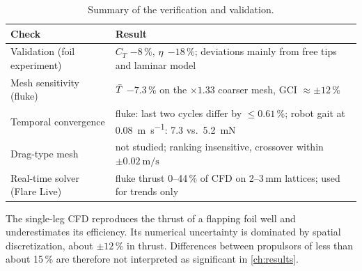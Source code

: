 \begin{table}[H]
  \centering
  \caption[Uncertainty summary]{Summary of the verification and validation.}
  \label{tab:uncertainty}
  \small
  \begin{tabularx}{\textwidth}{@{}l>{\raggedright\arraybackslash}X@{}}
    \toprule
    Check & Result \\
    \midrule
    Validation (foil experiment) & $C_T$ $-8$\,\%, $\eta$ $-18$\,\%; deviations mainly from free tips and laminar model \\
    Mesh sensitivity (fluke) & $\bar{T}$ $-7.3$\,\% on the $\times1.33$ coarser mesh, GCI $\approx\pm12$\,\% \\
    Temporal convergence & fluke: last two cycles differ by $\le0.61$\,\%; robot gait at \SI{0.08}{\metre\per\second}: 7.3 vs.\ \SI{5.2}{\milli\newton} \\
    Drag-type mesh & not studied; ranking insensitive, crossover within $\pm\SI{0.02}{\metre\per\second}$ \\
    Real-time solver (Flare Live) & fluke thrust 0--44\,\% of CFD on 2--3\,mm lattices; used for trends only \\
    \bottomrule
  \end{tabularx}
\end{table}

The single-leg CFD reproduces the thrust of a flapping foil well and underestimates its efficiency. Its numerical
uncertainty is dominated by spatial discretization, about $\pm12$\,\% in thrust. Differences between propulsors of
less than about 15\,\% are therefore not interpreted as significant in \cref{ch:results}.
